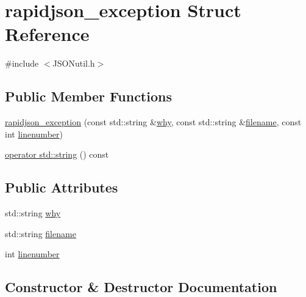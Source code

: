 \hypertarget{structrapidjson__exception}{}\section{rapidjson\+\_\+exception Struct Reference}
\label{structrapidjson__exception}


{\ttfamily \#include $<$J\+S\+O\+Nutil.\+h$>$}

\subsection*{Public Member Functions}
\begin{DoxyCompactItemize}
\item 
\hyperlink{structrapidjson__exception_ac81e815ea43f0364ebc365ad299584b9}{rapidjson\+\_\+exception} (const std\+::string \&\hyperlink{structrapidjson__exception_a6b432b89bd7052332bc923f274249e1e}{why}, const std\+::string \&\hyperlink{structrapidjson__exception_a56bc0e220fc6c7037e877f9f2e3f99f0}{filename}, const int \hyperlink{structrapidjson__exception_a9c0263f853d8a17911e29cae66708e67}{linenumber})
\item 
\hyperlink{structrapidjson__exception_aada8e228923b27da9151b7597d4fadce}{operator std\+::string} () const 
\end{DoxyCompactItemize}
\subsection*{Public Attributes}
\begin{DoxyCompactItemize}
\item 
std\+::string \hyperlink{structrapidjson__exception_a6b432b89bd7052332bc923f274249e1e}{why}
\item 
std\+::string \hyperlink{structrapidjson__exception_a56bc0e220fc6c7037e877f9f2e3f99f0}{filename}
\item 
int \hyperlink{structrapidjson__exception_a9c0263f853d8a17911e29cae66708e67}{linenumber}
\end{DoxyCompactItemize}


\subsection{Constructor \& Destructor Documentation}
\hypertarget{structrapidjson__exception_ac81e815ea43f0364ebc365ad299584b9}{}
